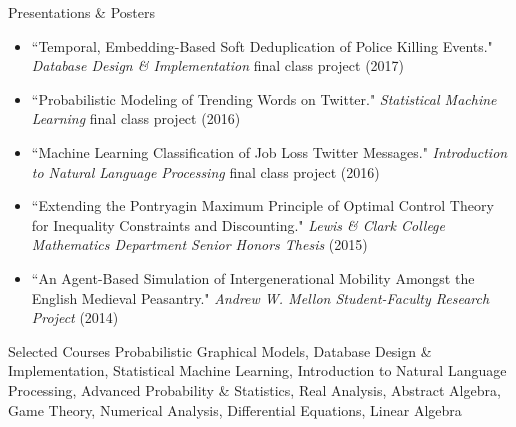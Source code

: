 \documentclass{resume} %
\begin{document}
\begin{rSection}{Presentations \& Posters}

\begin{itemize}
\item ``Temporal, Embedding-Based Soft Deduplication of Police Killing Events." \emph{Database Design \& Implementation} final class project (2017) 
\item  ``Probabilistic Modeling of Trending Words on Twitter." \emph{Statistical Machine Learning} final class project (2016) 
\item ``Machine Learning Classification of Job Loss Twitter Messages." \emph{Introduction to Natural Language Processing} final class project (2016) 
\item ``Extending the Pontryagin Maximum Principle of Optimal Control Theory for Inequality Constraints and Discounting." \emph{Lewis \& Clark College Mathematics Department Senior Honors Thesis} (2015)
\item ``An Agent-Based Simulation of Intergenerational Mobility Amongst the English Medieval Peasantry." \emph{Andrew W. Mellon Student-Faculty Research Project} (2014) 
\end{itemize} 

\end{rSection}



\begin{rSection}{Selected Courses}
Probabilistic Graphical Models, Database Design \& Implementation, Statistical Machine Learning, Introduction to Natural Language Processing, Advanced Probability \& Statistics, Real Analysis, Abstract Algebra, Game Theory, Numerical Analysis, Differential Equations, Linear Algebra 
\end{rSection}

\end{document}
